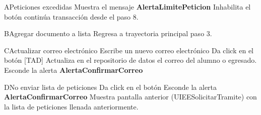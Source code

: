 \begin{UCtrayectoriaA}{A}{Peticiones excedidas} 
\UCpaso Muestra el mensaje {\bf AlertaLimitePeticion}
  \UCpaso Inhabilita el botón  	 
  \UCpaso continúa transacción desde el paso 8.
\end{UCtrayectoriaA}

\begin{UCtrayectoriaA}{B}{Agregar documento a lista} 
  \UCpaso Regresa a trayectoria principal paso 3.
\end{UCtrayectoriaA}

\begin{UCtrayectoriaA}{C}{Actualizar correo electrónico} 
  \UCpaso[\UCactor] Escribe un nuevo correo electrónico 
  \UCpaso[\UCactor] Da click en el botón  [TAD]
  \UCpaso Actualiza en el repositorio de datos el correo del alumno o egresado.
  \UCpaso Esconde la alerta {\bf AlertaConfirmarCorreo} 
\end{UCtrayectoriaA}

\begin{UCtrayectoriaA}{D}{No enviar lista de peticiones} 
 \UCpaso[\UCactor] Da click en el botón 
 \UCpaso Esconde la alerta  {\bf AlertaConfirmarCorreo} 
 \UCpaso Muestra pantalla anterior (UIEESolicitarTramite) con la lista de peticiones llenada anteriormente.
\end{UCtrayectoriaA}

